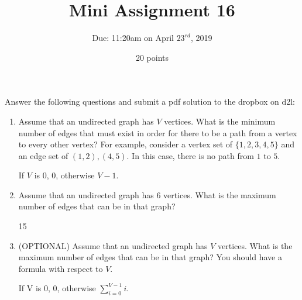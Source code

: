 \documentclass[12pt]{article}
\begin{document}
 
\title{Mini Assignment 16}
\author{Due: 11:20am on April $23^{rd}$, 2019}
\date{20 points}
\maketitle

Answer the following questions and submit a pdf solution to the dropbox on d2l:

\begin{enumerate}
    \item Assume that an undirected graph has $V$ vertices. What is the minimum number of edges that must exist in order for there to be a path from a vertex to every other vertex? For example, consider a vertex set of $\{1,2,3,4,5\}$ and an edge set of $(1,2), (4,5)$. In this case, there is no path from $1$ to $5$.
    \begin{center}
    	If $V$ is 0, 0, otherwise $V-1$.
    \end{center}
    \item Assume that an undirected graph has 6 vertices. What is the maximum number of edges that can be in that graph?
    \begin{center}
    	15
    \end{center}
    \item (OPTIONAL) Assume that an undirected graph has $V$ vertices. What is the maximum number of edges that can be in that graph? You should have a formula with respect to $V$.
    \begin{center}
    	If V is 0, 0, otherwise $\sum_{i=0}^{V-1}i$.
    \end{center}
\end{enumerate}
\end{document}
